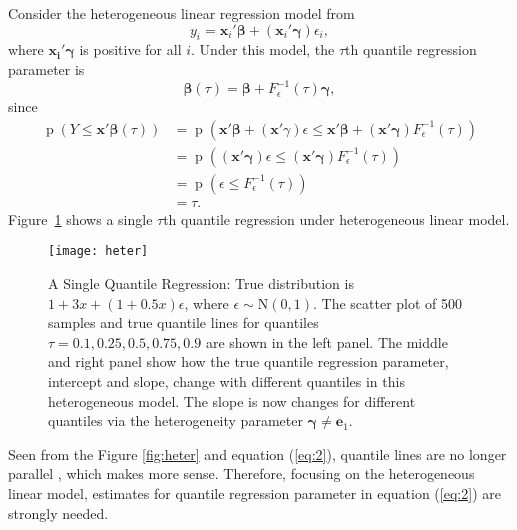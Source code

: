 \documentclass[12pt]{article}
\DeclareMathOperator{\pr}{p}
\begin{document}
Consider the heterogeneous linear regression model  from \citet{he1998}  
\begin{displaymath}
  y_i = \bm{x}_i'\bm{\beta} + (\bm{x}_i'\bm{\gamma}) \epsilon_i, 
\end{displaymath}
where $\bm{x_i'\gamma}$ is positive  for all
$i$. Under this model, the $\tau$th quantile regression parameter is 
\begin{equation}\label{eq:2}
  \bm{\beta}(\tau) = \bm{\beta} + F^{-1}_{\epsilon}(\tau) \bm{\gamma},
\end{equation}
since 
\begin{align*}
  \pr (Y \le \bm{x'\beta}(\tau)) & = \pr \left( \bm{x'\beta} +
    (\bm{x}'\gamma) \epsilon \le \bm{x'\beta} + (\bm{x'\gamma})
    F^{-1}_{\epsilon}(\tau) \right) \\
  & = \pr \left( (\bm{x'\gamma}) \epsilon \le  (\bm{x'\gamma})
    F^{-1}_{\epsilon}(\tau)  \right)\\
  & = \pr (\epsilon \le F^{-1}_{\epsilon}(\tau)) \\
  & = \tau .
\end{align*}
Figure~\ref{fig:hetero} shows a single $\tau$th quantile regression under
heterogeneous linear model.  

\begin{figure}[h]
  \centerline{\texttt{[image: heter]}}
  \caption[]{ \label{fig:heter} A Single Quantile Regression: True
    distribution is $1+3x + (1+0.5x)\epsilon$, where $\epsilon \sim
    \mathrm{N}(0,1)$. The scatter plot of 500 samples and true quantile
    lines for quantiles $\tau=0.1,0.25,0.5,0.75,0.9$ are shown in the
    left panel. The middle and right panel show how the true quantile
    regression parameter, intercept and slope, change with different
    quantiles in this heterogeneous model. The slope is now changes 
    for different quantiles via the heterogeneity parameter $\bm{\gamma}
    \neq \bm{e}_1$.  }
  \label{fig:hetero}
\end{figure}

Seen from the Figure \ref{fig:heter} and equation (\ref{eq:2}), quantile lines
are no longer parallel , which makes more sense. Therefore, focusing
on the heterogeneous linear model, estimates 
for quantile regression parameter in equation (\ref{eq:2}) are strongly
needed. 
\end{document}
